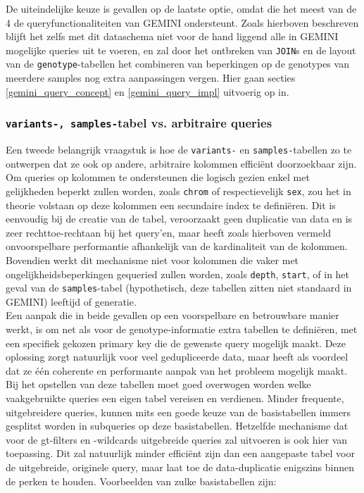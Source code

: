 De uiteindelijke keuze is gevallen op de laatste optie, omdat die het meest van de 4 de queryfunctionaliteiten van GEMINI ondersteunt. Zoals hierboven beschreven blijft het zelfs met dit dataschema niet voor de hand liggend alle in GEMINI mogelijke queries uit te voeren, en zal door het ontbreken van \texttt{JOIN}s en de layout van de \texttt{genotype}-tabellen het combineren van beperkingen op de genotypes van meerdere samples nog extra aanpassingen vergen. Hier gaan secties \ref{gemini_query_concept} en \ref{gemini_query_impl} uitvoerig op in.

\subsubsection{\texttt{variants-, samples-}tabel vs. arbitraire queries}

Een tweede belangrijk vraagstuk is hoe de \texttt{variants-} en \texttt{samples-}tabellen zo te ontwerpen dat ze ook op andere, arbitraire kolommen effici\"ent doorzoekbaar zijn.\\
Om queries op kolommen te ondersteunen die logisch gezien enkel met gelijkheden beperkt zullen worden, zoals \texttt{chrom} of respectievelijk \texttt{sex}, zou het in theorie volstaan op deze kolommen een secundaire index te defini\"eren. Dit is eenvoudig bij de creatie van de tabel, veroorzaakt geen duplicatie van data en is zeer rechttoe-rechtaan bij het query'en, maar heeft zoals hierboven vermeld onvoorspelbare performantie afhankelijk van de kardinaliteit van de kolommen. Bovendien werkt dit mechanisme niet voor kolommen die vaker met ongelijkheidsbeperkingen gequeried zullen worden, zoals \texttt{depth}, \texttt{start}, of in het geval van de \texttt{samples}-tabel (hypothetisch, deze tabellen zitten niet standaard in GEMINI) leeftijd of generatie.\\

Een aanpak die in beide gevallen op een voorspelbare en betrouwbare manier werkt, is om net als voor de genotype-informatie extra tabellen te defini\"eren, met een specifiek gekozen primary key die de gewenste query mogelijk maakt. Deze oplossing zorgt natuurlijk voor veel gedupliceerde data, maar heeft als voordeel dat ze \'e\'en coherente en performante aanpak van het probleem mogelijk maakt. Bij het opstellen van deze tabellen moet goed overwogen worden welke vaakgebruikte queries een eigen tabel vereisen en verdienen. Minder frequente, uitgebreidere queries, kunnen mits een goede keuze van de basistabellen immers gesplitst worden in subqueries op deze basistabellen. Hetzelfde mechanisme dat voor de gt-filters en -wildcards uitgebreide queries zal uitvoeren is ook hier van toepassing. Dit zal natuurlijk minder effici\"ent zijn dan een aangepaste tabel voor de uitgebreide, originele query, maar laat toe de data-duplicatie enigszins binnen de perken te houden. Voorbeelden van zulke basistabellen zijn:

